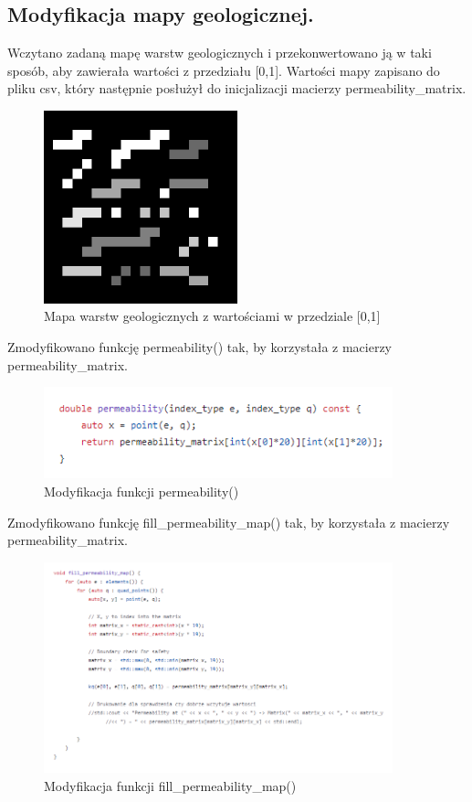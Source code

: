 \documentclass[onecolumn,12pt]{article}
\begin{document}
\subsection{Modyfikacja mapy geologicznej.}

Wczytano zadaną mapę warstw geologicznych i przekonwertowano ją w taki sposób, aby zawierała wartości z przedziału [0,1]. Wartości mapy zapisano do pliku csv, który następnie posłużył do inicjalizacji macierzy permeability\_matrix.

\begin{figure}[H]
    \centering
    \includegraphics[width=0.5\textwidth]{init_matrix.png}
    \caption{Mapa warstw geologicznych z wartościami w przedziale [0,1]}
    \label{fig:example}
\end{figure}

Zmodyfikowano funkcję permeability() tak, by korzystała z macierzy permeability\_matrix.
\begin{figure}[H]
    \centering
    \includegraphics[width=0.9\textwidth]{permeability.png}
    \caption{Modyfikacja funkcji permeability()}
    \label{fig:example}
\end{figure}

Zmodyfikowano funkcję fill\_permeability\_map() tak, by korzystała z macierzy permeability\_matrix.
\begin{figure}[H]
    \centering
    \includegraphics[width=0.9\textwidth]{fill_permeability_map.png}
    \caption{Modyfikacja funkcji fill\_permeability\_map()}
    \label{fig:example}
\end{figure}
\end{document}
